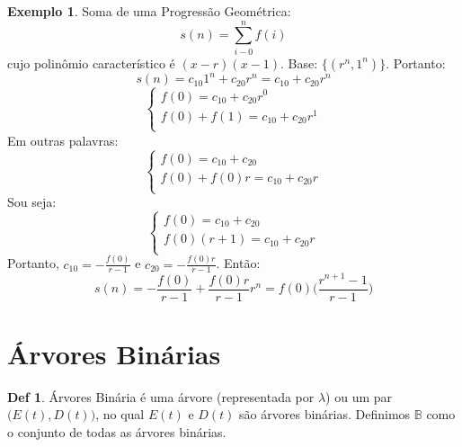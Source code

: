\documentclass[a4paper,11pt]{article}
\theoremstyle{definition} \newtheorem{definicao}{Def}
\theoremstyle{definition} \newtheorem{exemplo}{Exemplo}
\theoremstyle{plain}      \newtheorem{teorema}{Teorema}
\theoremstyle{remark}     \newtheorem*{corolario}{Corol\'{a}rio}
\begin{document}
\begin{exemplo}
Soma de uma Progress\~{a}o Geom\'{e}trica:
\begin{equation*}
s(n) = \sum_{i-0}^{n} f(i)
\end{equation*}
cujo polin\^{o}mio caracter\'{i}stico \'{e} $(x-r)(x-1).$
Base: $\{(r^n,1^n)\}$. Portanto:
\begin{equation*}
s(n) = c_{10}1^n + c_{20}r^n = c_{10} + c_{20}r^n
\end{equation*}
\begin{equation*}
\begin{cases}
f(0) = c_{10} + c_{20}r^0 \\
f(0) + f(1) = c_{10}+c_{20}r^1 \\
\end{cases}
\end{equation*}
Em outras palavras:
\begin{equation*}
\begin{cases}
f(0) = c_{10}+c_{20} \\
f(0) + f(0)r = c_{10}+c_{20}r \\
\end{cases}
\end{equation*}
Sou seja:
\begin{equation*}
\begin{cases}
f(0) = c_{10}+c_{20} \\
f(0)(r+1) = c_{10}+c_{20}r \\
\end{cases}
\end{equation*}
Portanto, $c_{10}=-\frac{f(0)}{r-1}$ e $c_{20}=-\frac{f(0)r}{r-1}$.
Ent\~{a}o:
\begin{equation*}
s(n) = -\frac{f(0)}{r-1} + \frac{f(0)r}{r-1}r^n =
f(0)\Big(\frac{r^{n+1}-1}{r-1}\Big)
\end{equation*}
\end{exemplo}

\section{\'{A}rvores Bin\'{a}rias}

\begin{definicao}
\'{A}rvores Bin\'{a}ria \'{e} uma \'{a}rvore (representada por $\lambda$)
ou um par $\Big(E(t),D(t)\Big)$, no qual $E(t)$ e $D(t)$ s\~{a}o
\'{a}rvores bin\'{a}rias. Definimos $\mathbb{B}$ como o conjunto de todas
as \'{a}rvores bin\'{a}rias.
\end{definicao}
\end{document}
